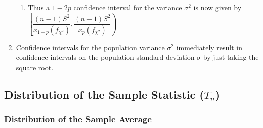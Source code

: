 \begin{enumerate}
\begin{enumerate}
        \item Thus a $1 - 2 p$ confidence interval for the variance $\sigma^ 2$ is now given by
        $\left[\dfrac{(n - 1)S^2}{x_{1- p} ( f_{\chi^2} )}, \dfrac{(n - 1)S^2}{x _p ( f_{\chi^2})}  \right)$
        \hfill \cite{statistics/book/Statistics-for-Data-Scientists/Maurits-Kaptein}
    \end{enumerate}

    \item Confidence intervals for the population variance $\sigma^ 2$ immediately result in confidence intervals on the population standard deviation $\sigma$ by just taking the square root.
    \hfill \cite{statistics/book/Statistics-for-Data-Scientists/Maurits-Kaptein}
\end{enumerate}








\subsection{Distribution of the Sample Statistic ($T_n$)}

\subsubsection{Distribution of the Sample Average}

